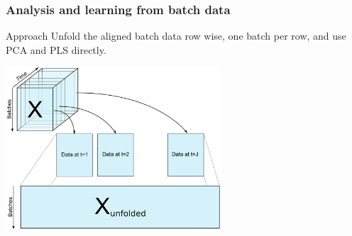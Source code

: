 \begin{frame}\frametitle{Analysis and learning from batch data}

	\begin{exampleblock}{Approach}
	Unfold the aligned batch data row wise, one batch per row, and use PCA and PLS directly.
	\end{exampleblock}

	\begin{center}
		\includegraphics[width=8cm]{images/batch-data-unfolding-X-only.png}	
	\end{center}
\end{frame}	

